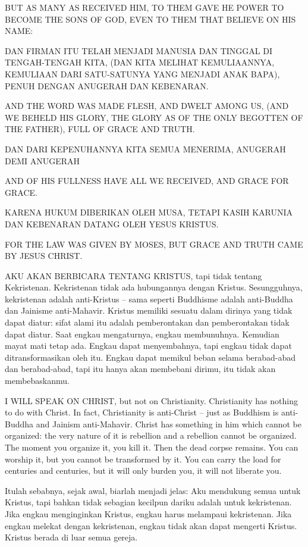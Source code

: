  BUT AS MANY AS RECEIVED HIM, TO THEM GAVE HE POWER TO BECOME THE SONS OF GOD, EVEN TO THEM THAT BELIEVE ON HIS NAME:

 DAN FIRMAN ITU TELAH MENJADI MANUSIA DAN TINGGAL DI TENGAH-TENGAH KITA, (DAN KITA MELIHAT KEMULIAANNYA, KEMULIAAN DARI SATU-SATUNYA YANG MENJADI ANAK BAPA), PENUH DENGAN ANUGERAH DAN KEBENARAN.

 AND THE WORD WAS MADE FLESH, AND DWELT AMONG US, (AND WE BEHELD HIS GLORY, THE GLORY AS OF THE ONLY BEGOTTEN OF THE FATHER), FULL OF GRACE AND TRUTH.

 DAN DARI KEPENUHANNYA KITA SEMUA MENERIMA, ANUGERAH DEMI ANUGERAH

 AND OF HIS FULLNESS HAVE ALL WE RECEIVED, AND GRACE FOR GRACE.

 KARENA HUKUM DIBERIKAN OLEH MUSA, TETAPI KASIH KARUNIA DAN KEBENARAN DATANG OLEH YESUS KRISTUS.

 FOR THE LAW WAS GIVEN BY MOSES, BUT GRACE AND TRUTH CAME BY JESUS CHRIST.

\bahasa
AKU AKAN BERBICARA TENTANG KRISTUS, tapi tidak tentang Kekristenan. Kekristenan tidak ada hubungannya dengan Kristus. Sesungguhnya, kekristenan adalah anti-Kristus -- sama seperti Buddhisme adalah anti-Buddha dan Jainisme anti-Mahavir. Kristus memiliki sesuatu dalam dirinya yang tidak dapat diatur: sifat alami itu adalah pemberontakan dan pemberontakan tidak dapat diatur. Saat engkau mengaturnya, engkau membunuhnya. Kemudian mayat mati tetap ada. Engkau dapat menyembahnya, tapi engkau tidak dapat ditransformasikan oleh itu. Engkau dapat memikul beban selama berabad-abad dan berabad-abad, tapi itu hanya akan membebani dirimu, itu tidak akan membebaskanmu.

\english
I WILL SPEAK ON CHRIST, but not on Christianity. Christianity has nothing to do with Christ. In fact, Christianity is anti-Christ -- just as Buddhism is anti-Buddha and Jainism anti-Mahavir. Christ has something in him which cannot be organized: the very nature of it is rebellion and a rebellion cannot be organized. The moment you organize it, you kill it. Then the dead corpse remains. You can worship it, but you cannot be transformed by it. You can carry the load for centuries and centuries, but it will only burden you, it will not liberate you.

\bahasa
Itulah sebabnya, sejak awal, biarlah menjadi jelas: Aku mendukung semua untuk Kristus, tapi bahkan tidak sebagian kecilpun dariku  adalah untuk kekristenan. Jika engkau menginginkan Kristus, engkau harus melampaui kekristenan. Jika engkau melekat dengan kekristenan, engkau tidak akan dapat mengerti Kristus. Kristus berada di luar semua gereja.


